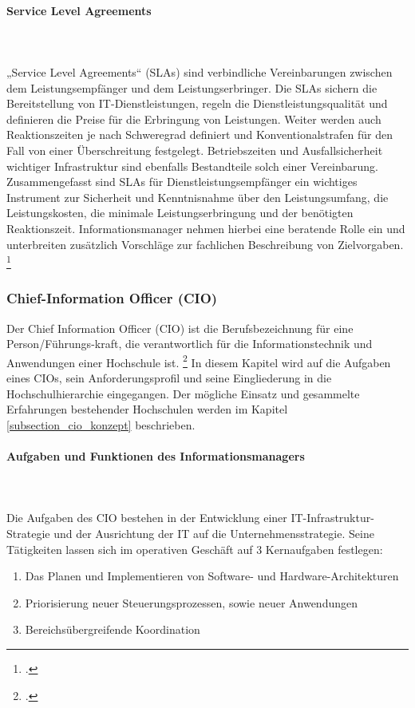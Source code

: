 \paragraph{Service Level Agreements}\mbox{}\\\\
„Service Level Agreements“ (SLAs) sind verbindliche Vereinbarungen zwischen dem Leistungsempfänger 
und dem Leistungserbringer. Die SLAs sichern die Bereitstellung von IT-Dienstleistungen, regeln die 
Dienstleistungsqualität und definieren die Preise für die Erbringung von Leistungen. Weiter werden auch 
Reaktionszeiten je nach Schweregrad definiert und Konventionalstrafen für den Fall von einer 
Überschreitung festgelegt. Betriebszeiten und Ausfallsicherheit wichtiger Infrastruktur sind ebenfalls 
Bestandteile solch einer Vereinbarung.
Zusammengefasst sind SLAs für Dienstleistungsempfänger ein wichtiges Instrument zur Sicherheit und 
Kenntnisnahme über den Leistungsumfang, die Leistungskosten, die minimale Leistungserbringung 
und der benötigten Reaktionszeit. Informationsmanager nehmen hierbei eine beratende Rolle ein und 
unterbreiten zusätzlich Vorschläge zur fachlichen Beschreibung von Zielvorgaben. 
\footcite[Vgl.][499]{heinrich_stelzer_2011}


\subsubsection{Chief-Information Officer (CIO)}
\label{subsubsection_cio}
Der Chief Information Officer (CIO) ist die Berufsbezeichnung für eine Person/Führungs-kraft, die 
verantwortlich für die Informationstechnik und Anwendungen einer Hochschule ist. 
\footcite[Vgl.][]{beuschel_2009} In diesem Kapitel wird auf die Aufgaben eines CIOs, sein Anforderungsprofil und seine Eingliederung in die Hochschulhierarchie eingegangen. Der mögliche Einsatz und gesammelte Erfahrungen bestehender Hochschulen werden im Kapitel \ref{subsection_cio_konzept} beschrieben.

\paragraph{Aufgaben und Funktionen des Informationsmanagers}\mbox{}\\\\
\label{aufgaben_funktionen_informationsmanager}
Die Aufgaben des CIO bestehen in der Entwicklung einer IT-Infrastruktur-Strategie und der Ausrichtung der IT auf die Unternehmensstrategie. Seine Tätigkeiten lassen sich im operativen Geschäft auf 3 Kernaufgaben festlegen: 
\begin{enumerate}
	\item Das Planen und Implementieren von Software- und Hardware-Architekturen 
	\item Priorisierung neuer Steuerungsprozessen, sowie neuer Anwendungen
	\item Bereichsübergreifende Koordination
\end{enumerate}

